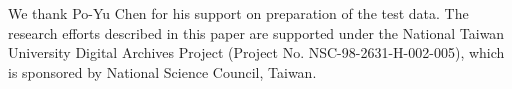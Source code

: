 
We thank Po-Yu Chen for his support on preparation of the test data.  The
research efforts described in this paper are supported under the National Taiwan
University Digital Archives Project (Project No.  NSC-98-2631-H-002-005), which
is sponsored by National Science Council, Taiwan. 
